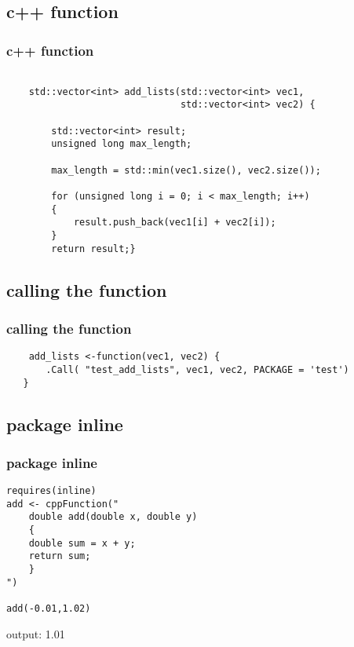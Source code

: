 \documentclass[hyperef={
    colorlinks=true,
    linkcolor=blue,
    filecolor=black,
urlcolor=blue}
]{beamer}
\begin{document}
\subsection{c++ function}
\begin{frame}[fragile]
\frametitle{c++ function}
\begin{verbatim}

    std::vector<int> add_lists(std::vector<int> vec1,
                               std::vector<int> vec2) {
        
        std::vector<int> result;
        unsigned long max_length;
        
        max_length = std::min(vec1.size(), vec2.size());
        
        for (unsigned long i = 0; i < max_length; i++)
        {
            result.push_back(vec1[i] + vec2[i]);
        }
        return result;}

\end{verbatim} 
\end{frame}

\subsection{calling the function}
\begin{frame}[fragile]
\frametitle{calling the function}

\begin{verbatim}
    add_lists <-function(vec1, vec2) {
       .Call( "test_add_lists", vec1, vec2, PACKAGE = 'test')
   }
\end{verbatim}

\end{frame}

\subsection{package inline}
\begin{frame}[fragile]
\frametitle{package inline}
\begin{verbatim}
requires(inline)
add <- cppFunction("
    double add(double x, double y)
    {
    double sum = x + y;
    return sum;
    }
")

add(-0.01,1.02)
\end{verbatim}
output:
1.01
\end{frame}
\end{document}
